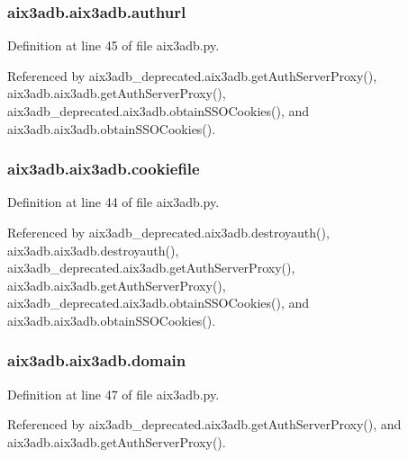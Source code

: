 \subsubsection[{authurl}]{\setlength{\rightskip}{0pt plus 5cm}aix3adb.\-aix3adb.\-authurl}\label{classaix3adb_1_1aix3adb_a913a05ec4848539c69d6232dc718c415}


Definition at line 45 of file aix3adb.\-py.



Referenced by aix3adb\-\_\-deprecated.\-aix3adb.\-get\-Auth\-Server\-Proxy(), aix3adb.\-aix3adb.\-get\-Auth\-Server\-Proxy(), aix3adb\-\_\-deprecated.\-aix3adb.\-obtain\-S\-S\-O\-Cookies(), and aix3adb.\-aix3adb.\-obtain\-S\-S\-O\-Cookies().

\subsubsection[{cookiefile}]{\setlength{\rightskip}{0pt plus 5cm}aix3adb.\-aix3adb.\-cookiefile}\label{classaix3adb_1_1aix3adb_a91e300fb29d73e97f47e70fd94ff2709}


Definition at line 44 of file aix3adb.\-py.



Referenced by aix3adb\-\_\-deprecated.\-aix3adb.\-destroyauth(), aix3adb.\-aix3adb.\-destroyauth(), aix3adb\-\_\-deprecated.\-aix3adb.\-get\-Auth\-Server\-Proxy(), aix3adb.\-aix3adb.\-get\-Auth\-Server\-Proxy(), aix3adb\-\_\-deprecated.\-aix3adb.\-obtain\-S\-S\-O\-Cookies(), and aix3adb.\-aix3adb.\-obtain\-S\-S\-O\-Cookies().

\subsubsection[{domain}]{\setlength{\rightskip}{0pt plus 5cm}aix3adb.\-aix3adb.\-domain}\label{classaix3adb_1_1aix3adb_af747cd1cee6c88ff214c2837fca42a69}


Definition at line 47 of file aix3adb.\-py.



Referenced by aix3adb\-\_\-deprecated.\-aix3adb.\-get\-Auth\-Server\-Proxy(), and aix3adb.\-aix3adb.\-get\-Auth\-Server\-Proxy().

